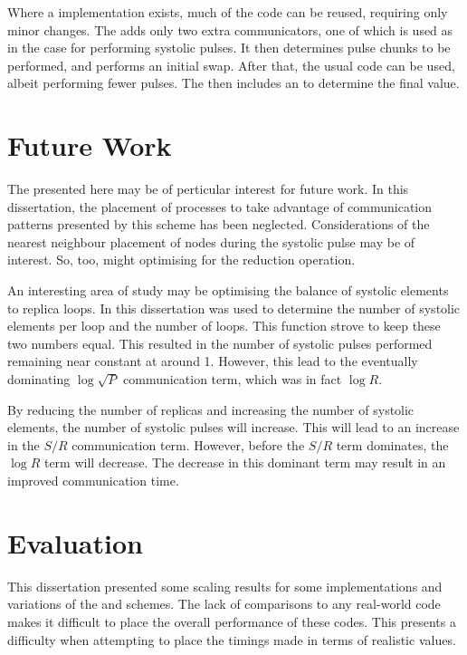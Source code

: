 Where a \systolicloop{} implementation exists, much of the code can
be reused, requiring only minor changes.
%
The \replicatedsystolicloop{} adds only two extra
communicators, one of which is used as in the \systolicloop{} case
for performing systolic pulses.
%
It then determines pulse chunks to be performed, and performs
an initial swap.
%
After that, the usual \systolicloop{} code can be used, albeit performing
fewer pulses.
%
The \replicatedsystolicloop{} then includes an \mpiallreduce{} to determine
the final value.


\section{Future Work}

The \replicatedsystolicloop{} presented here may be of perticular
interest for future work.
%
In this dissertation, the placement of processes to take advantage
of communication patterns presented by this scheme has been neglected.
%
Considerations of the nearest neighbour placement of nodes during the
systolic pulse may be of interest.
%
So, too, might optimising for the reduction operation.

An interesting area of study may be optimising the balance of
systolic elements to replica loops.
%
In this dissertation \mpidimscreate{} was used to determine the
number of systolic elements per loop and the number of loops.
%
This function strove to keep these two numbers equal.
%
This resulted in the number of systolic pulses performed remaining
near constant at around 1.
%
However, this lead to the eventually dominating $\log{\sqrt{P}}$
communication term, which was in fact $\log{R}$.

By reducing the number of replicas and increasing the number of
systolic elements, the number of systolic pulses will increase.
%
This will lead to an increase in the $S/R$ communication term.
%
However, before the $S/R$ term dominates, the $\log{R}$ term will
decrease.
%
The decrease in this dominant term may result in an improved
communication time.


\section{Evaluation}

This dissertation presented some scaling results for some implementations
and variations of the \replicateddata{} and \systolicloop{} schemes.
%
The lack of comparisons to any real-world code makes it difficult
to place the overall performance of these codes.
%
This presents a difficulty when attempting to place the timings
made in terms of realistic values.

